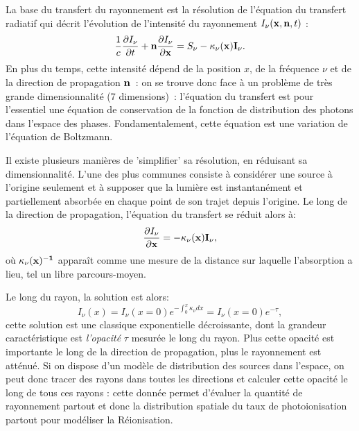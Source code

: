 La base du transfert du rayonnement est la résolution de l'équation du transfert radiatif qui décrit l'évolution de l'intensité du rayonnement $I_\nu({\bf x},{\bf n} ,t)$ :
\begin{equation}
\frac{1}{c}\frac{\partial I_\nu}{\partial t}+{\bf n} \frac{\partial I_\nu}{\partial {\bf x}}=S_\nu - \kappa_\nu(\bf x) I_\nu.
\end{equation}
En plus du temps, cette intensité dépend de la position $x$, de la fréquence $\nu$ et de la direction de propagation $\bf n$~: on se trouve donc face à un problème de très grande dimensionnalité (7 dimensions)~: l'équation du transfert est pour l'essentiel une équation de conservation de la fonction de distribution des photons dans l'espace des phases. Fondamentalement, cette équation est une variation de l'équation de Boltzmann.

Il existe plusieurs manières de 'simplifier' sa résolution, en réduisant sa dimensionnalité. L'une des plus communes consiste à considérer une source à l'origine seulement et à supposer que la lumière est instantanément et partiellement absorbée en chaque point de son trajet depuis l'origine. Le long de la direction de propagation, l'équation du transfert se réduit alors à:
\begin{equation}
 \frac{\partial I_\nu}{\partial {\bf x}}=- \kappa_\nu(\bf x) I_\nu,
\end{equation}
où $\kappa_\nu(\bf x)^{-1}$ apparaît comme une mesure de la distance sur laquelle l'absorption a lieu, tel un libre parcours-moyen.

Le long du rayon, la solution est alors:
\begin{equation}
I_\nu(x)=I_\nu(x=0)e^{-\int_0^x \kappa_\nu dx}=I_\nu(x=0)e^{-\tau},
\end{equation}
cette solution est une classique exponentielle décroissante, dont la grandeur caractéristique est \textit{l'opacité} $\tau$ mesurée le long du rayon. Plus cette opacité est importante le long de la direction de propagation, plus le rayonnement est atténué. Si on dispose d'un modèle de distribution des sources dans l'espace, on peut donc tracer des rayons dans toutes les directions et calculer cette opacité le long de tous ces rayons : cette donnée permet d'évaluer la quantité de rayonnement partout et donc la distribution spatiale du taux de photoionisation partout pour modéliser la Réionisation.

